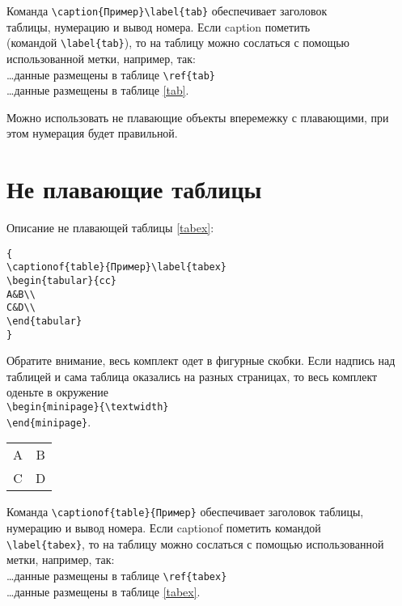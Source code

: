 Команда \verb|\caption{Пример}\label{tab}|  обеспечивает заголовок\\таблицы, нумерацию и вывод номера. Если caption пометить \\ 
(командой \verb|\label{tab}|), то на таблицу можно сослаться с помощью использованной метки, например, так:\\
\ldots данные размещены в таблице \verb|\ref{tab}| \\
\ldots данные размещены в таблице \ref{tab}. 

Можно использовать не плавающие объекты вперемежку с плавающими, при этом нумерация будет правильной.

\section{Не плавающие таблицы}

Описание не плавающей таблицы \ref{tabex}:

\begin{verbatim}
{
\captionof{table}{Пример}\label{tabex}
\begin{tabular}{cc}
A&B\\
C&D\\
\end{tabular}
}
\end{verbatim}

Обратите внимание, весь комплект одет в фигурные скобки.
Если надпись над таблицей и сама таблица оказались на разных страницах, то весь комплект оденьте в окружение\\
\verb|\begin{minipage}{\textwidth}|\\
\verb|\end{minipage}|.

{
\label{tabex}
\begin{tabular}{cc}
A&B\\
C&D\\
\end{tabular}
}

Команда \verb|\captionof{table}{Пример}| обеспечивает заголовок таблицы, нумерацию и вывод номера. Если captionof пометить командой \\ 
\verb|\label{tabex}|, то на таблицу можно сослаться с помощью использованной метки, например, так:\\
\ldots данные размещены в таблице \verb|\ref{tabex}| \\
\ldots данные размещены в таблице \ref{tabex}. 


